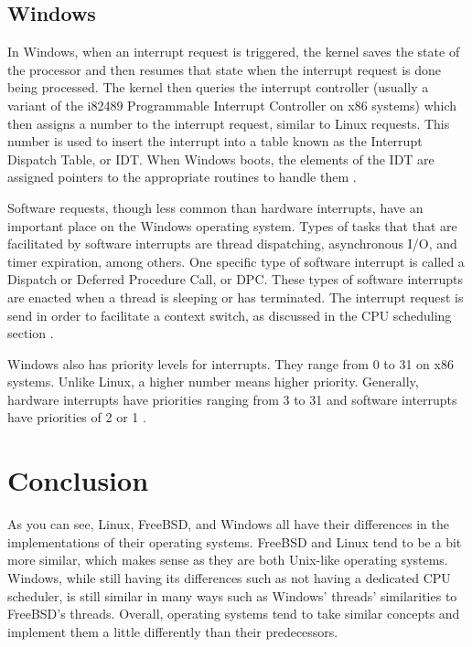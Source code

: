 \documentclass[10pt,draftclsnofoot,onecolumn,journal,compsoc]{IEEEtran}
\begin{document}
\subsection{Windows}
In Windows, when an interrupt request is triggered, the kernel saves the state of the processor and then resumes that state when the interrupt request is done being processed. The kernel then queries the interrupt controller (usually a variant of the i82489 Programmable Interrupt Controller on x86 systems) which then assigns a number to the interrupt request, similar to Linux requests. This number is used to insert the interrupt into a table known as the Interrupt Dispatch Table, or IDT. When Windows boots, the elements of the IDT are assigned pointers to the appropriate routines to handle them \cite{win_shd}. 

Software requests, though less common than hardware interrupts, have an important place on the Windows operating system. Types of tasks that that are facilitated by software interrupts are thread dispatching, asynchronous I/O, and timer expiration, among others. One specific type of software interrupt is called a Dispatch or Deferred Procedure Call, or DPC. These types of software interrupts are enacted when a thread is sleeping or has terminated. The interrupt request is send in order to facilitate a context switch, as discussed in the CPU scheduling section \cite{win_shd}.

Windows also has priority levels for interrupts. They range from 0 to 31 on x86 systems. Unlike Linux, a higher number means higher priority. Generally, hardware interrupts have priorities ranging from 3 to 31 and software interrupts have priorities of 2 or 1 \cite{win_shd}. 

\section{Conclusion}
As you can see, Linux, FreeBSD, and Windows all have their differences in the implementations of their operating systems. FreeBSD and Linux tend to be a bit more similar, which makes sense as they are both Unix-like operating systems. Windows, while still having its differences such as not having a dedicated CPU scheduler, is still similar in many ways such as Windows' threads' similarities to FreeBSD's threads. Overall, operating systems tend to take similar concepts and implement them a little differently than their predecessors. 

\newpage
\end{document}
